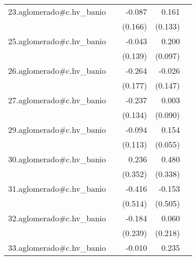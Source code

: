 {\begin{longtable}{l*{4}{D{.}{.}{-1}}}
\addlinespace
23.aglomerado#c.hv\_banio&                     &      -0.087         &       0.161         &                     \\
            &                     &     (0.166)         &     (0.133)         &                     \\
\addlinespace
25.aglomerado#c.hv\_banio&                     &      -0.043         &       0.200\sym{*}  &                     \\
            &                     &     (0.139)         &     (0.097)         &                     \\
\addlinespace
26.aglomerado#c.hv\_banio&                     &      -0.264         &      -0.026         &                     \\
            &                     &     (0.177)         &     (0.147)         &                     \\
\addlinespace
27.aglomerado#c.hv\_banio&                     &      -0.237         &       0.003         &                     \\
            &                     &     (0.134)         &     (0.090)         &                     \\
\addlinespace
29.aglomerado#c.hv\_banio&                     &      -0.094         &       0.154\sym{**} &                     \\
            &                     &     (0.113)         &     (0.055)         &                     \\
\addlinespace
30.aglomerado#c.hv\_banio&                     &       0.236         &       0.480         &                     \\
            &                     &     (0.352)         &     (0.338)         &                     \\
\addlinespace
31.aglomerado#c.hv\_banio&                     &      -0.416         &      -0.153         &                     \\
            &                     &     (0.514)         &     (0.505)         &                     \\
\addlinespace
32.aglomerado#c.hv\_banio&                     &      -0.184         &       0.060         &                     \\
            &                     &     (0.239)         &     (0.218)         &                     \\
\addlinespace
33.aglomerado#c.hv\_banio&                     &      -0.010         &       0.235\sym{***}&                     \\

\end{longtable}}
